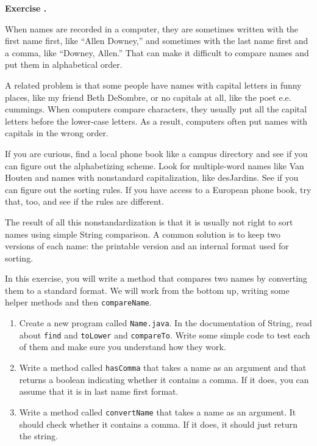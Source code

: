 \documentclass{book}
\newcounter{exercisenum}
\renewcommand{\theexercisenum}{{\thechapter}.\arabic{exercisenum}}
\newenvironment{exercisesize}{\begin{small}}{\end{small}}
\newcommand{\exerciseheader}[2]{                                          
     
  \begin{exercisesize}                                                    
     
     
  \def\theenumi{\alph{enumi}}                                             
  \def\labelenumi{\theenumi.}                                             
  \def\theenumii{\roman{enumii}}                                          
  \def\labelenumii{\theenumii.}                                           
  {\bf Exercise {#1}{#2}}\hspace{0.1in}                 
}
\newcommand{\startexercise}[1]{%
  \refstepcounter{exercisenum}                                            
  \exerciseheader{\theexercisenum}{#1}                                    
}
\newcommand{\stopexercise}{%
  {\hfill}                                                               
  \end{exercisesize}      
}
\newcommand{\normaldif}{}
\newenvironment{exercise}{\startexercise{\normaldif{}}}{\stopexercise}
\begin{document}
\begin{exercise}

When names are recorded in a computer, they are sometimes written with
the first name first, like ``Allen Downey,'' and sometimes with the
last name first and a comma, like ``Downey, Allen.''  That can make
it difficult to compare names and put them in alphabetical order.

A related problem is that some people have names with capital letters
in funny places, like my friend Beth DeSombre, or no capitals at all,
like the poet e.e. cummings.  When computers compare characters, they
usually put all the capital letters before the lower-case letters.  As
a result, computers often put names with capitals in the wrong order.

If you are curious, find a local phone book like a campus directory
and see if you can figure out the alphabetizing scheme.  Look for
multiple-word names like Van Houten and names with nonstandard
capitalization, like desJardins.  See if you can figure out the 
sorting rules.  If you have access to a European phone book, try
that, too, and see if the rules are different.

The result of all this nonstandardization is that it is usually not
right to sort names using simple String comparison.
A common solution is to keep two versions of each name: the
printable version and an internal format used for sorting.

In this exercise, you will write a method that compares two
names by converting them to a standard format.  We will work
from the bottom up, writing some helper methods and then
{\tt compareName}.

\begin{enumerate}

\item Create a new program called {\tt Name.java}.  In the
documentation of String, read about {\tt find} and {\tt toLower} and
{\tt compareTo}.  Write some simple code to test each of them and
make sure you understand how they work.

\item Write a method called {\tt hasComma} that takes a name as an
argument and that returns a boolean indicating whether it contains a
comma.  If it does, you can assume that it is in last name first
format.

\item Write a method called {\tt convertName} that takes
a name as an argument.  It should check whether it contains a
comma.  If it does, it should just return the string.


\end{enumerate}
\end{exercise}
\end{document}
